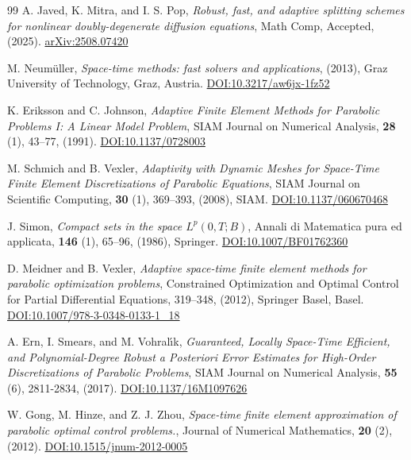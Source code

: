 \documentclass[review,11pt]{article}
\numberwithin{equation}{section}
\begin{document}
\begin{thebibliography}{99}
A. Javed, K. Mitra, and I. S. Pop, \emph{Robust, fast, and adaptive splitting schemes for nonlinear doubly-degenerate diffusion equations}, Math Comp,  Accepted, (2025). \href{https://arxiv.org/abs/2508.07420}{arXiv:2508.07420}


M. Neum{\"u}ller, \emph{Space-time methods: fast solvers and applications}, (2013), Graz University of Technology, Graz, Austria. \href{https://doi.org/10.3217/aw6jx-1fz52}{DOI:10.3217/aw6jx-1fz52}

K. Eriksson and C. Johnson, \emph{{Adaptive Finite Element Methods} for {Parabolic Problems} {I}: {A Linear Model Problem}}, SIAM Journal on Numerical Analysis, \textbf{28} (1), 43--77, (1991). \href{https://doi.org/10.1137/0728003}{DOI:10.1137/0728003}

M. Schmich and B. Vexler, \emph{Adaptivity with Dynamic Meshes for Space-Time Finite Element Discretizations of Parabolic Equations}, SIAM Journal on Scientific Computing, \textbf{30} (1), 369--393, (2008), SIAM. \href{https://doi.org/10.1137/060670468}{DOI:10.1137/060670468}


J. Simon, \emph{Compact sets in the space {$L^p(0, T; B)$}}, Annali di Matematica pura ed applicata, \textbf{146} (1), 65--96, (1986), Springer. \href{https://doi.org/10.1007/BF01762360}{DOI:10.1007/BF01762360}

D. Meidner and B. Vexler, \emph{Adaptive space-time finite element methods for parabolic optimization problems}, Constrained Optimization and Optimal Control for Partial Differential Equations, 319--348, (2012), Springer Basel, Basel. \href{https://doi.org/10.1007/978-3-0348-0133-1\_18}{DOI:10.1007/978-3-0348-0133-1\_18}

A. Ern, I. Smears, and M. Vohral\'{\i}k, \emph{Guaranteed, Locally Space-Time Efficient, and Polynomial-Degree Robust a Posteriori Error Estimates for High-Order Discretizations of Parabolic Problems}, SIAM Journal on Numerical Analysis, \textbf{55} (6), 2811-2834, (2017). \href{https://doi.org/10.1137/16M1097626}{DOI:10.1137/16M1097626}

W. Gong, M. Hinze, and Z. J. Zhou, \emph{Space-time finite element approximation of parabolic optimal control problems.}, Journal of Numerical Mathematics, \textbf{20} (2), (2012). \href{https://doi.org/10.1515/jnum-2012-0005}{DOI:10.1515/jnum-2012-0005}


\end{thebibliography}
\end{document}
